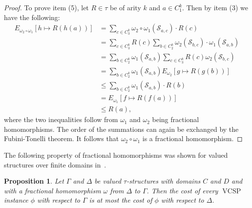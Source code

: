 \documentclass[nonacm]{acmart}
\DeclareMathOperator{\VCSP}{VCSP}
\newtheorem{proposition}[theorem]{Proposition}
\begin{document}
\begin{proof}
To prove item (5), let $R \in \tau$ be of arity $k$ and $a \in C_1^k$. Then by item (3) we have the following:
\begin{align*}
    E_{\omega_2 \circ \omega_1}[h \mapsto R(h(a))] &= \sum_{c \in C_3^k} \omega_2 \circ \omega_1(\mathscr{S}_{a,c}) \cdot R(c) \\
    &= \sum_{c \in C_3^k} R(c) \sum_{b\in C_2^k} \omega_2(\mathscr{S}_{b,c}) \cdot \omega_1(\mathscr{S}_{a,b}) \\
    &= \sum_{b\in C_2^k}\omega_1(\mathscr{S}_{a,b})  \sum_{c \in C_3^k} R(c)  \omega_2(\mathscr{S}_{b,c}) \\
    &= \sum_{b\in C_2^k}\omega_1(\mathscr{S}_{a,b}) E_{\omega_2}[g \mapsto R(g(b))] \\
    &\leq \sum_{b\in C_2^k}\omega_1(\mathscr{S}_{a,b}) \cdot R(b) \\
    &= E_{\omega_1}[f \mapsto R(f(a))] \\
    &\leq R(a),
\end{align*}
where the two inequalities follow from $\omega_1$ and $\omega_2$ being fractional homomorphisms.
The order of the summations can again be exchanged by the Fubini-Tonelli theorem.
It follows that $\omega_2 \circ \omega_1$ is a fractional homomorphism.
\end{proof}

The following property of fractional homomorphisms was shown for valued structures over finite domains in~\cite[Proposition 8.4]{Butti}.

\begin{proposition}
    \label{prop:frac-hom}
Let $\Gamma$ and $\Delta$ be valued $\tau$-structures 
with domains $C$ and $D$ and with a fractional homomorphism $\omega$ from $\Delta$ to $\Gamma$. Then the cost of every $\VCSP$ instance $\phi$ with respect to $\Gamma$ is at most the cost of $\phi$ with respect to $\Delta$. 
\end{proposition}
\end{document}
